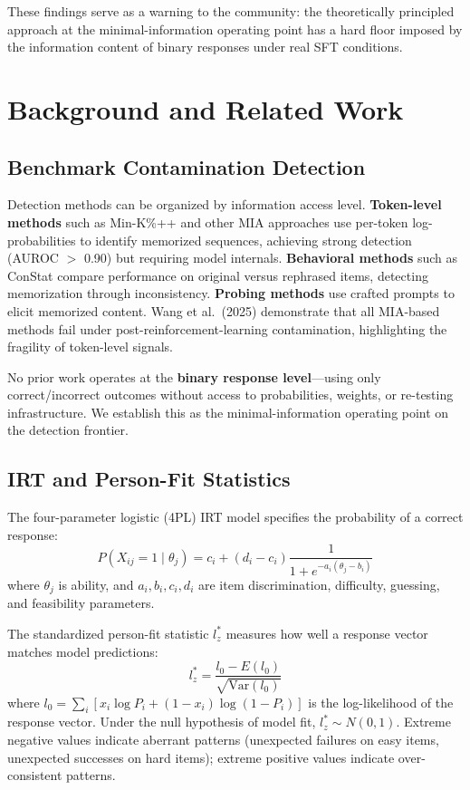 \documentclass[11pt,a4paper]{article}
\begin{document}
These findings serve as a warning to the community: the theoretically principled approach at the minimal-information operating point has a hard floor imposed by the information content of binary responses under real SFT conditions.

\section{Background and Related Work}

\subsection{Benchmark Contamination Detection}

Detection methods can be organized by information access level.
\textbf{Token-level methods} such as Min-K\%++ \cite{shi2024detecting} and other MIA approaches use per-token log-probabilities to identify memorized sequences, achieving strong detection (AUROC $>$ 0.90) but requiring model internals.
\textbf{Behavioral methods} such as ConStat \cite{li2024constat} compare performance on original versus rephrased items, detecting memorization through inconsistency.
\textbf{Probing methods} \cite{oren2024proving,golchin2024time} use crafted prompts to elicit memorized content.
Wang et al.\ (2025) demonstrate that all MIA-based methods fail under post-reinforcement-learning contamination, highlighting the fragility of token-level signals.

No prior work operates at the \textbf{binary response level}---using only correct/incorrect outcomes without access to probabilities, weights, or re-testing infrastructure.
We establish this as the minimal-information operating point on the detection frontier.

\subsection{IRT and Person-Fit Statistics}

The four-parameter logistic (4PL) IRT model specifies the probability of a correct response:
\begin{equation}
P(X_{ij}=1 \mid \theta_j) = c_i + (d_i - c_i) \frac{1}{1 + e^{-a_i(\theta_j - b_i)}}
\end{equation}
where $\theta_j$ is ability, and $a_i, b_i, c_i, d_i$ are item discrimination, difficulty, guessing, and feasibility parameters.

The standardized person-fit statistic $l_{z}^{*}$ \cite{drasgow1985appropriateness,snijders2001} measures how well a response vector matches model predictions:
\begin{equation}
l_{z}^{*} = \frac{l_0 - E(l_0)}{\sqrt{\text{Var}(l_0)}}
\end{equation}
where $l_0 = \sum_i [x_i \log P_i + (1-x_i) \log(1-P_i)]$ is the log-likelihood of the response vector.
Under the null hypothesis of model fit, $l_{z}^{*} \sim N(0,1)$.
Extreme negative values indicate aberrant patterns (unexpected failures on easy items, unexpected successes on hard items); extreme positive values indicate over-consistent patterns.
\end{document}
